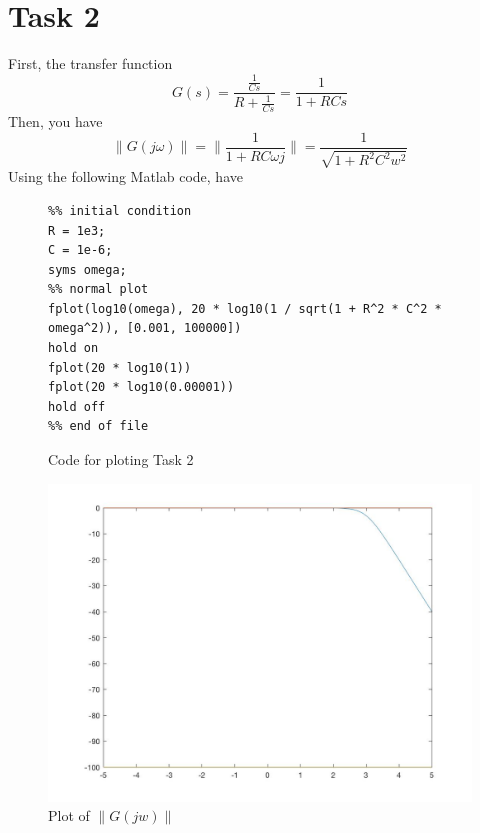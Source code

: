 \documentclass{article}
\begin{document}
\section*{Task 2}
First, the transfer function
$$ G(s) = \frac{\frac{1}{C s}}{R + \frac{1}{C s}} = \frac{1}{1 + R C s}$$
Then, you have
$$ \|G(j \omega)\| = \| \frac{1}{1 + R C \omega j} \| = \frac{1}{\sqrt{1 + R^2 C^2 w^2}}$$
Using the following Matlab code, have
\begin{figure}
\begin{verbatim}
%% initial condition
R = 1e3;
C = 1e-6;
syms omega;
%% normal plot
fplot(log10(omega), 20 * log10(1 / sqrt(1 + R^2 * C^2 * omega^2)), [0.001, 100000])
hold on
fplot(20 * log10(1))
fplot(20 * log10(0.00001))
hold off
%% end of file
\end{verbatim}
\caption{Code for ploting Task 2}
\end{figure}
\begin{figure}[H]
    \centering
    \includegraphics[width=\textwidth]{task2.jpg}
    \caption{Plot of $\| G(jw) \|$}
\end{figure}
\end{document}
